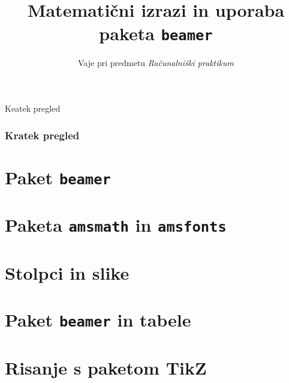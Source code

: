 \documentclass{beamer}
\title{Matematični izrazi in uporaba paketa \texttt{beamer}}
\date{}
\institute{Fakulteta za matematiko in fiziko}
\subtitle{Vaje pri predmetu \emph{Računalniški praktikum}}
\begin{document}
\begin{frame}
    \titlepage
\end{frame}




\begin{frame}{Keatek pregled}
    \tableofcontents%

    \frametitle{Kratek pregled}
\end{frame}
\section{Paket \texttt{beamer}}

\section{Paketa \texttt{amsmath} in \texttt{amsfonts}}

\section{Stolpci in slike}

\section{Paket \texttt{beamer} in tabele}

\section{Risanje s paketom TikZ}

\end{document}
